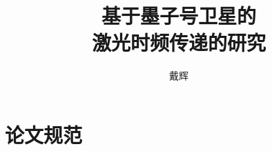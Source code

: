 \documentclass[doctor]{ustcthesis}
\title{基于墨子号卫星的\\激光时频传递的研究}
\author{戴辉}
\begin{document}
\maketitle


\frontmatter

\tableofcontents
% 

\mainmatter









\appendix
\chapter{论文规范}

\backmatter


\end{document}
